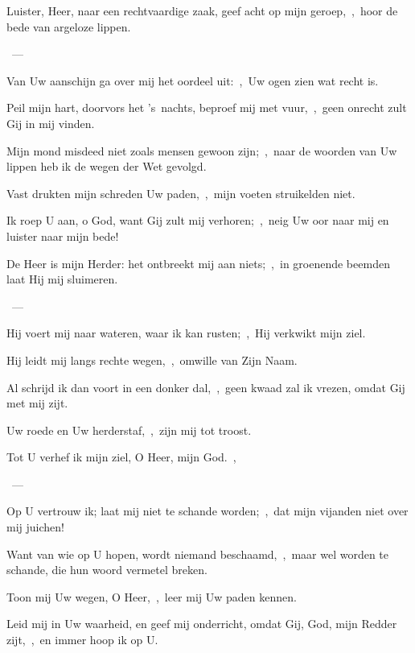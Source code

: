 \documentclass[12pt,twoside,a5paper]{article}
\begin{document}

\begin{halfparskip}
  Luister, Heer, naar een rechtvaardige zaak, geef acht op mijn geroep,~\sep\ hoor de bede van argeloze lippen.

  ~--- 

  Van Uw aanschijn ga over mij het oordeel uit:~\sep\ Uw ogen zien wat recht is.

  Peil mijn hart, doorvors het 's~nachts, beproef mij met vuur,~\sep\ geen onrecht zult Gij in mij vinden.

  Mijn mond misdeed niet zoals mensen gewoon zijn;~\sep\ naar de woorden van Uw lippen heb ik de wegen der Wet gevolgd.

  Vast drukten mijn schreden Uw paden,~\sep\ mijn voeten struikelden niet.

  Ik roep U aan, o God, want Gij zult mij verhoren;~\sep\ neig Uw oor naar mij en luister naar mijn bede!
\end{halfparskip}


\begin{halfparskip}
  De Heer is mijn Herder: het ontbreekt mij aan niets;~\sep\ in groenende beemden laat Hij mij sluimeren.

  ~--- 

  Hij voert mij naar wateren, waar ik kan rusten;~\sep\ Hij verkwikt mijn ziel.

  Hij leidt mij langs rechte wegen,~\sep\ omwille van Zijn Naam.

  Al schrijd ik dan voort in een donker dal,~\sep\ geen kwaad zal ik vrezen, omdat Gij met mij zijt.

  Uw roede en Uw herderstaf,~\sep\ zijn mij tot troost.
\end{halfparskip}


\begin{halfparskip}
  Tot U verhef ik mijn ziel, O Heer, mijn God.~\sep

  ~--- 

  Op U vertrouw ik; laat mij niet te schande worden;~\sep\ dat mijn vijanden niet over mij juichen!

  Want van wie op U hopen, wordt niemand beschaamd,~\sep\ maar wel worden te schande, die hun woord vermetel breken.

  Toon mij Uw wegen, O Heer,~\sep\ leer mij Uw paden kennen.

  Leid mij in Uw waarheid, en geef mij onderricht, omdat Gij, God, mijn Redder zijt,~\sep\ en immer hoop ik op U.
\end{halfparskip}
\end{document}
